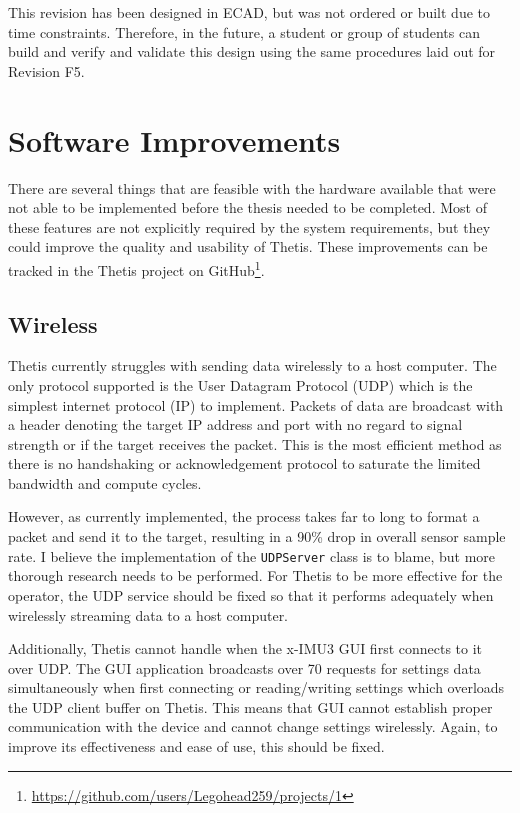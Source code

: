 This revision has been designed in ECAD, but was not ordered or built due to time constraints.
Therefore, in the future, a student or group of students can build and verify and validate this design using the same procedures laid out for Revision F5.


\section{Software Improvements} 
There are several things that are feasible with the hardware available that were not able to be implemented before the thesis needed to be completed.
Most of these features are not explicitly required by the system requirements, but they could improve the quality and usability of Thetis.
These improvements can be tracked in the Thetis project on GitHub\footnote{\url{https://github.com/users/Legohead259/projects/1}}.

\subsection{Wireless} 
Thetis currently struggles with sending data wirelessly to a host computer.
The only protocol supported is the User Datagram Protocol (UDP) which is the simplest internet protocol (IP) to implement.
Packets of data are broadcast with a header denoting the target IP address and port with no regard to signal strength or if the target receives the packet.
This is the most efficient method as there is no handshaking or acknowledgement protocol to saturate the limited bandwidth and compute cycles.

However, as currently implemented, the process takes far to long to format a packet and send it to the target, resulting in a 90\% drop in overall sensor sample rate.
I believe the implementation of the \lstinline[style=customInline]|UDPServer| class is to blame, but more thorough research needs to be performed.
For Thetis to be more effective for the operator, the UDP service should be fixed so that it performs adequately when wirelessly streaming data to a host computer.

Additionally, Thetis cannot handle when the x-IMU3 GUI first connects to it over UDP.
The GUI application broadcasts over 70 requests for settings data simultaneously when first connecting or reading/writing settings which overloads the UDP client buffer on Thetis.
This means that GUI cannot establish proper communication with the device and cannot change settings wirelessly.
Again, to improve its effectiveness and ease of use, this should be fixed.

